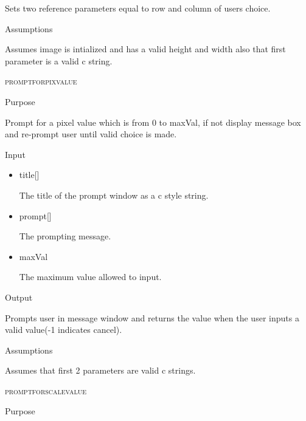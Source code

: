 \documentclass[pdftex, 11pt]{article}
\begin{document}
\begin{description}
\begin{description}
				Sets two reference parameters equal to row and column of
				users choice.

			\item{Assumptions}

				Assumes image is intialized and has a valid height and width
				also that first parameter is a valid c string.

		\end{description}



	\item{\textsc{promptforpixvalue}}
		\begin{description}
			\item{Purpose}

				Prompt for a pixel value which is from 0 to maxVal, if not display message
				box and re-prompt user until valid choice is made.

			\item{Input}

				\begin{itemize}
					
					\item{title[]}

						The title of the prompt window as a c style string.

					\item{prompt[]}

						The prompting message.

					\item{maxVal}

						The maximum value allowed to input.

				\end{itemize}

			\item{Output}

				Prompts user in message window and returns the value when
				the user inputs a valid value(-1 indicates cancel).

			\item{Assumptions}

				Assumes that first 2 parameters are valid c strings.

		\end{description}



	\item{\textsc{promptforscalevalue}}

		\begin{description}
			\item{Purpose}


\end{description}
\end{description}
\end{document}
